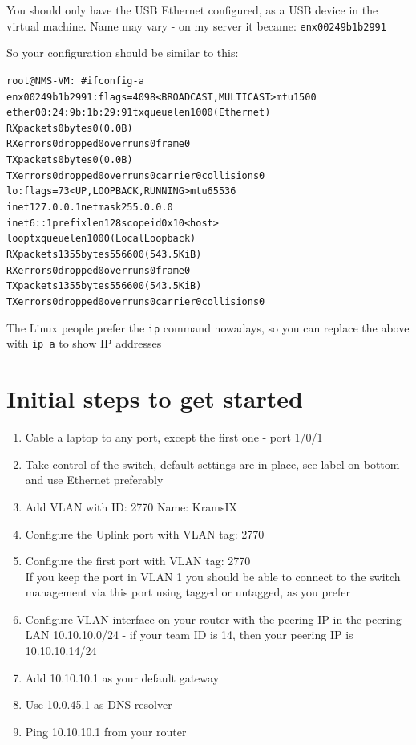 \documentclass[a4paper,11pt,notitlepage]{report}
\begin{document}
You should only have the USB Ethernet configured, as a USB device in the virtual machine. Name may vary - on my server it became: \verb+enx00249b1b2991+

So your configuration should be similar to this:
\begin{alltt}
root@NMS-VM:~# ifconfig  -a
enx00249b1b2991: flags=4098<BROADCAST,MULTICAST>  mtu 1500
        ether 00:24:9b:1b:29:91  txqueuelen 1000  (Ethernet)
        RX packets 0  bytes 0 (0.0 B)
        RX errors 0  dropped 0  overruns 0  frame 0
        TX packets 0  bytes 0 (0.0 B)
        TX errors 0  dropped 0 overruns 0  carrier 0  collisions 0
lo: flags=73<UP,LOOPBACK,RUNNING>  mtu 65536
        inet 127.0.0.1  netmask 255.0.0.0
        inet6 ::1  prefixlen 128  scopeid 0x10<host>
        loop  txqueuelen 1000  (Local Loopback)
        RX packets 1355  bytes 556600 (543.5 KiB)
        RX errors 0  dropped 0  overruns 0  frame 0
        TX packets 1355  bytes 556600 (543.5 KiB)
        TX errors 0  dropped 0 overruns 0  carrier 0  collisions 0
\end{alltt}

The Linux people prefer the \verb+ip+ command nowadays, so you can replace the above with \verb+ip a+ to show IP addresses

\section*{Initial steps to get started}
\begin{enumerate}
\item Cable a laptop to any port, except the first one - port 1/0/1
\item Take control of the switch, default settings are in place, see label on bottom and use Ethernet preferably
\item Add VLAN with ID: 2770 Name: KramsIX
\item Configure the Uplink port with VLAN tag: 2770
\item Configure the first port with VLAN tag: 2770\\
If you keep the port in VLAN 1 you should be able to connect to the switch management via this port using tagged or untagged, as you prefer \smiley
\item Configure VLAN interface on your router with the peering IP in the peering LAN 10.10.10.0/24 - if your team ID is 14, then your peering IP is 10.10.10.14/24
\item Add 10.10.10.1 as your default gateway
\item Use 10.0.45.1 as DNS resolver
\item Ping 10.10.10.1 from your router
\end{enumerate}
\end{document}
